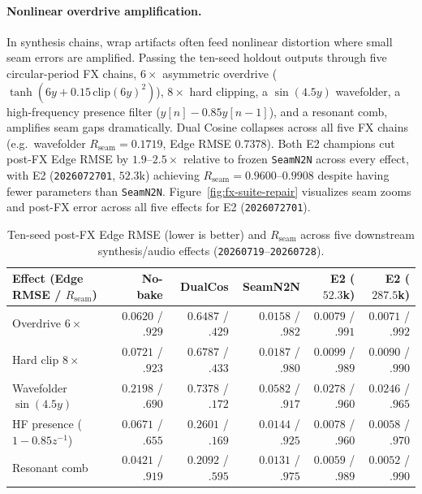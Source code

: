\paragraph{Nonlinear overdrive amplification.}
In synthesis chains, wrap artifacts often feed nonlinear distortion where small seam errors are amplified.
Passing the ten-seed holdout outputs through five circular-period FX chains, $6{\times}$ asymmetric overdrive ($\tanh(6y + 0.15\,\mathrm{clip}(6y)^2)$), $8{\times}$ hard clipping, a $\sin(4.5y)$ wavefolder, a high-frequency presence filter ($y[n]{-}0.85y[n{-}1]$), and a resonant comb, amplifies seam gaps dramatically.
Dual Cosine collapses across all five FX chains (e.g.\ wavefolder $R_{\mathrm{seam}}{=}0.1719$, Edge RMSE $0.7378$).
Both E2 champions cut post-FX Edge RMSE by $1.9$--$2.5{\times}$ relative to frozen \texttt{SeamN2N} across every effect, with E2 (\texttt{2026072701}, $52.3$k) achieving $R_{\mathrm{seam}}{=}0.9600$--$0.9908$ despite having fewer parameters than \texttt{SeamN2N}.
Figure~\ref{fig:fx-suite-repair} visualizes seam zooms and post-FX error across all five effects for E2 (\texttt{2026072701}).

\begin{table}[t]
  \centering
  \caption{Ten-seed post-FX Edge RMSE (lower is better) and $R_{\mathrm{seam}}$ across five downstream synthesis/audio effects (\texttt{20260719}--\texttt{20260728}).}
  \label{tab:fx-suite}
  \setlength{\tabcolsep}{7pt}
  \small
  \begin{tabular}{@{}lrrrrr@{}}
    \toprule
    Effect (Edge RMSE / $R_{\mathrm{seam}}$) & No-bake & DualCos & SeamN2N & E2 ($52.3$k) & E2 ($287.5$k) \\
    \midrule
    Overdrive $6{\times}$ & $0.0620$ / $.929$ & $0.6487$ / $.429$ & $0.0158$ / $.982$ & $0.0079$ / $.991$ & $0.0071$ / $.992$ \\
    Hard clip $8{\times}$ & $0.0721$ / $.923$ & $0.6787$ / $.433$ & $0.0187$ / $.980$ & $0.0099$ / $.989$ & $0.0090$ / $.990$ \\
    Wavefolder $\sin(4.5y)$ & $0.2198$ / $.690$ & $0.7378$ / $.172$ & $0.0582$ / $.917$ & $0.0278$ / $.960$ & $0.0246$ / $.965$ \\
    HF presence ($1{-}0.85z^{-1}$) & $0.0671$ / $.655$ & $0.2601$ / $.169$ & $0.0144$ / $.925$ & $0.0078$ / $.960$ & $0.0058$ / $.970$ \\
    Resonant comb & $0.0421$ / $.919$ & $0.2092$ / $.595$ & $0.0131$ / $.975$ & $0.0059$ / $.989$ & $0.0052$ / $.990$ \\
    \bottomrule
  \end{tabular}
\end{table}

